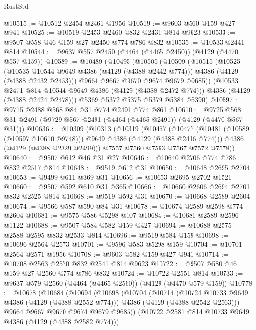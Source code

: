 \begin{lexlean}{RustStd}
\begin{coremodule}
{\begin{coremodule}
{{{{{{{{{{{{{{@10515 := @10512 @2454 @2461 @1956
@10519 := @9603 @560 @159 @427 @941
@10525 := @10519 @2453 @2460 @832 @2431 @814 @9623
@10533 := @9507 @558 @46 @159 @27 @2450 @774 @786 @832
@10535 := @10533 @2441 @814
@10544 := @9637 @557 @2450 (@4464 (@4465 @2450)) (@4129 (@4470 @557 @159))
@10589 := @10489
    (@10495
      (@10505
        (@10509
          (@10515
            (@10525
              (@10535 @10544 @9649 @4386 (@4129 (@4388 @2442 @774)))
              @4386
              (@4129 (@4388 @2432 @2453)))
            @9664
            @9667
            @9670
            @9674
            @9679
            @9685))
        (@10533 @2471 @814 @10544 @9649 @4386 (@4129 (@4388 @2472 @774)))
        @4386
        (@4129 (@4388 @2424 @2478)))
      @5369
      @5372
      @5375
      @5379
      @5384
      @5390)
@10597 := @9715 @2488 @568 @84 @31 @774 @2491 @774 @861
@10610 := @9725 @568 @31 @2491 (@9729 @567 @2491 (@4464 (@4465 @2491)) (@4129 (@4470 @567 @31)))
@10636 := @10309
    (@10313
      (@10319
        (@10467
          (@10477 (@10481 (@10589 (@10597 @10610 @9748))) @9649 @4386 (@4129 (@4388 @2416 @774)))
          @4386
          (@4129 (@4388 @2329 @2499)))
        @7557
        @7560
        @7563
        @7567
        @7572
        @7578))
@10640 := @9507 @612 @46 @31 @27
@10646 := @10640 @2706 @774 @786 @832 @2517 @814
@10648 := @9519 @612 @31
@10650 := @10648 @2695 @2704
@10653 := @9499 @611 @369 @31
@10656 := @10653 @2695 @2702 @1521
@10660 := @9507 @592 @610 @31 @365
@10666 := @10660 @2606 @2694 @2701 @832 @2525 @814
@10668 := @9519 @592 @31
@10670 := @10668 @2589 @2604
@10674 := @9566 @587 @590 @84 @31
@10678 := @10674 @2589 @2598 @774 @2604
@10681 := @9575 @586 @5298 @107
@10684 := @10681 @2589 @2596 @1122
@10688 := @9507 @584 @582 @159 @427
@10694 := @10688 @2575 @2588 @2595 @832 @2533 @814
@10696 := @9519 @584 @159
@10698 := @10696 @2564 @2573
@10701 := @9596 @583 @5298 @159
@10704 := @10701 @2564 @2571 @1956
@10708 := @9603 @582 @159 @427 @941
@10714 := @10708 @2563 @2570 @832 @2541 @814 @9623
@10722 := @9507 @580 @46 @159 @27 @2560 @774 @786 @832
@10724 := @10722 @2551 @814
@10733 := @9637 @579 @2560 (@4464 (@4465 @2560)) (@4129 (@4470 @579 @159))
@10778 := @10678
    (@10684
      (@10694
        (@10698
          (@10704
            (@10714
              (@10724 @10733 @9649 @4386 (@4129 (@4388 @2552 @774)))
              @4386
              (@4129 (@4388 @2542 @2563)))
            @9664
            @9667
            @9670
            @9674
            @9679
            @9685))
        (@10722 @2581 @814 @10733 @9649 @4386 (@4129 (@4388 @2582 @774)))
}}}}}}}}}}}}}}
\end{coremodule}}
\end{coremodule}
\end{lexlean}
